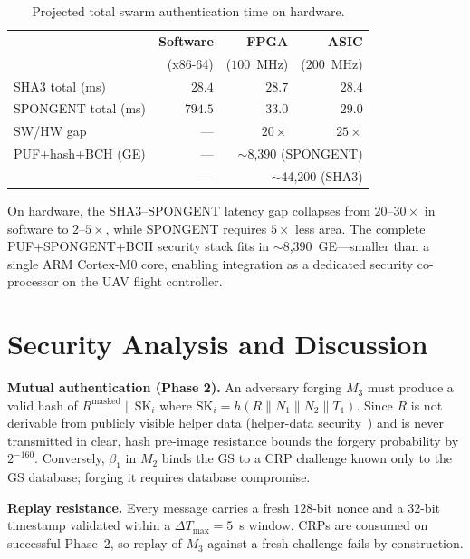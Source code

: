 \documentclass[conference,a4paper,10pt]{IEEEtran}
\begin{document}
\begin{table}[t]
\centering
\caption{Projected total swarm authentication time on hardware.}
\label{tab:hw}
\begin{tabular}{@{}lrrr@{}}
\toprule
& \textbf{Software} & \textbf{FPGA} & \textbf{ASIC} \\
& (x86-64) & ($100$~MHz) & ($200$~MHz) \\
\midrule
SHA3 total (ms)      & $28.4$  & $28.7$ & $28.4$ \\
SPONGENT total (ms)  & $794.5$ & $33.0$ & $29.0$ \\
SW/HW gap            & ---     & $20\times$ & $25\times$ \\
\midrule
PUF+hash+BCH (GE)    & ---     & \multicolumn{2}{r}{$\sim$8{,}390 (SPONGENT)} \\
                     & ---     & \multicolumn{2}{r}{$\sim$44{,}200 (SHA3)} \\
\bottomrule
\end{tabular}
\end{table}

On hardware, the SHA3--SPONGENT latency gap collapses from
$20$--$30\times$ in software to $2$--$5\times$, while SPONGENT
requires $5\times$ less area. The complete PUF+SPONGENT+BCH security
stack fits in $\sim$8{,}390~GE---smaller than a single ARM Cortex-M0
core, enabling integration as a dedicated security co-processor on
the UAV flight controller.


\section{Security Analysis and Discussion}
\label{sec:security}

\textbf{Mutual authentication (Phase 2).} An adversary forging $M_3$
must produce a valid hash of $R^{\mathrm{masked}} \| \mathrm{SK}_i$
where $\mathrm{SK}_i = h(R \| N_1 \| N_2 \| T_1)$. Since $R$ is not
derivable from publicly visible helper data (helper-data
security~\cite{helper_data_masking}) and is never transmitted in
clear, hash pre-image resistance bounds the forgery probability by
$2^{-160}$. Conversely, $\beta_1$ in $M_2$ binds the GS to a CRP
challenge known only to the GS database; forging it requires
database compromise.

\textbf{Replay resistance.} Every message carries a fresh
$128$-bit nonce and a $32$-bit timestamp validated within a
$\Delta T_{\max}{=}5$~s window. CRPs are consumed on successful
Phase~2, so replay of $M_3$ against a fresh challenge fails by
construction.
\end{document}
